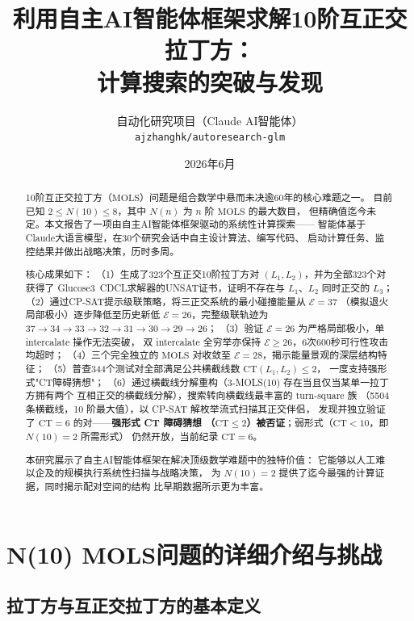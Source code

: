 \documentclass[11pt,a4paper]{ctexart}
\title{\textbf{利用自主AI智能体框架求解10阶互正交拉丁方：\\
计算搜索的突破与发现}}
\author{自动化研究项目（Claude AI智能体）\\
\small\texttt{ajzhanghk/autoresearch-glm}}
\date{2026年6月}
\theoremstyle{remark}
\newcommand{\CT}{\mathrm{CT}}
\newcommand{\E}{\mathcal{E}}
\newcommand{\MOLS}{\mathrm{MOLS}}
\begin{document}
\maketitle

\begin{abstract}
10阶互正交拉丁方（$\MOLS$）问题是组合数学中悬而未决逾60年的核心难题之一。
目前已知 $2 \le N(10) \le 8$，其中 $N(n)$ 为 $n$ 阶 $\MOLS$ 的最大数目，
但精确值迄今未定。本文报告了一项由自主AI智能体框架驱动的系统性计算探索——
智能体基于Claude大语言模型，在30个研究会话中自主设计算法、编写代码、
启动计算任务、监控结果并做出战略决策，历时多周。

核心成果如下：
（1）生成了323个互正交10阶拉丁方对 $(L_1, L_2)$，并为全部323个对获得了
Glucose3~CDCL求解器的UNSAT证书，证明不存在与 $L_1$、$L_2$ 同时正交的 $L_3$；
（2）通过CP-SAT提示级联策略，将三正交系统的最小碰撞能量从 $\E = 37$
（模拟退火局部极小）逐步降低至历史新低 $\E = 26$，完整级联轨迹为
$37 \to 34 \to 33 \to 32 \to 31 \to 30 \to 29 \to 26$；
（3）验证 $\E = 26$ 为严格局部极小，单 intercalate 操作无法突破，
双 intercalate 全穷举亦保持 $\E \ge 26$，6次600秒可行性攻击均超时；
（4）三个完全独立的 $\MOLS$ 对收敛至 $\E = 28$，揭示能量景观的深层结构特征；
（5）普查344个测试对全部满足公共横截线数 $\CT(L_1, L_2) \le 2$，
一度支持强形式"CT障碍猜想"；
（6）通过横截线分解重构（3-MOLS(10) 存在当且仅当某单一拉丁方拥有两个
互相正交的横截线分解），搜索转向横截线最丰富的 turn-square 族
（5504 条横截线，10 阶最大值），以 CP-SAT 解枚举流式扫描其正交伴侣，
发现并独立验证了 $\CT = 6$ 的对——\textbf{强形式 CT 障碍猜想
（$\CT\le2$）被否证}；弱形式（$\CT < 10$，即 $N(10)=2$ 所需形式）
仍然开放，当前纪录 $\CT = 6$。

本研究展示了自主AI智能体框架在解决顶级数学难题中的独特价值：
它能够以人工难以企及的规模执行系统性扫描与战略决策，
为 $N(10) = 2$ 提供了迄今最强的计算证据，同时揭示配对空间的结构
比早期数据所示更为丰富。
\end{abstract}

\tableofcontents

\newpage

\section{N(10) MOLS问题的详细介绍与挑战}
\label{sec:problem}

\subsection{拉丁方与互正交拉丁方的基本定义}
\end{document}
